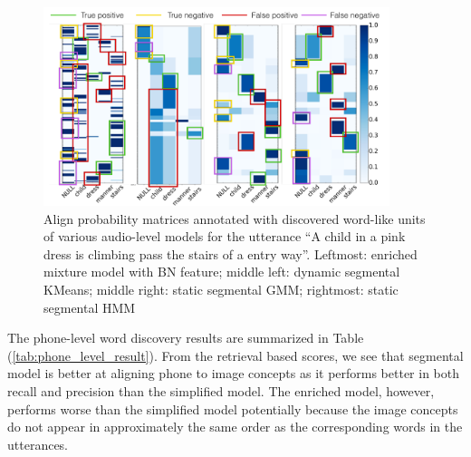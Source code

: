 \documentclass[journal]{IEEEtran}
\begin{document}
\begin{figure}[t]
    \centering
    \includegraphics[width=0.9\textwidth]{fig_9.png}
    \caption{Align probability matrices annotated with discovered word-like units of various audio-level models for the utterance ``A child in a pink dress is climbing pass the stairs of a entry way''. Leftmost: enriched mixture model with BN feature; middle left: dynamic segmental KMeans; middle right: static segmental GMM; rightmost: static segmental HMM}
    \label{fig:audio_alignprob_plots}
\end{figure}

The phone-level word discovery results are summarized in Table (\ref{tab:phone_level_result}).
From the retrieval based scores, we see that segmental model is better at aligning phone to image concepts as it performs better in both recall and precision than the simplified model. The enriched model, however, performs worse than the simplified model potentially because the image concepts do not appear in approximately the same order as the corresponding words in the utterances. 
\end{document}
